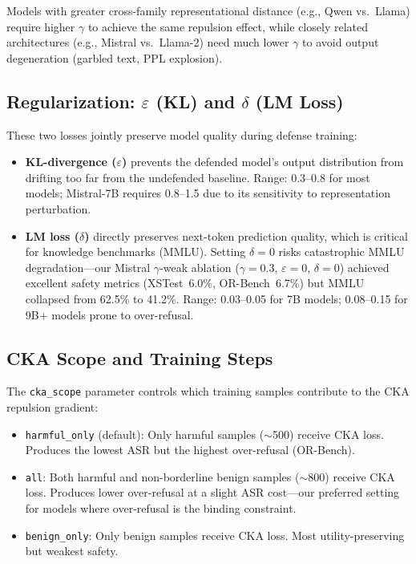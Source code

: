 \noindent Models with greater cross-family representational distance (e.g., Qwen vs.\ Llama) require higher $\gamma$ to achieve the same repulsion effect, while closely related architectures (e.g., Mistral vs.\ Llama-2) need much lower $\gamma$ to avoid output degeneration (garbled text, PPL explosion).

\subsection{Regularization: $\varepsilon$ (KL) and $\delta$ (LM Loss)}
\label{app:hyperparams:reg}

These two losses jointly preserve model quality during defense training:

\begin{itemize}[nosep,leftmargin=*]
    \item \textbf{KL-divergence ($\varepsilon$)} prevents the defended model's output distribution from drifting too far from the undefended baseline. Range: 0.3--0.8 for most models; Mistral-7B requires 0.8--1.5 due to its sensitivity to representation perturbation.
    \item \textbf{LM loss ($\delta$)} directly preserves next-token prediction quality, which is critical for knowledge benchmarks (MMLU). Setting $\delta = 0$ risks catastrophic MMLU degradation---our Mistral $\gamma$-weak ablation ($\gamma{=}0.3$, $\varepsilon{=}0$, $\delta{=}0$) achieved excellent safety metrics (XSTest~6.0\%, OR-Bench~6.7\%) but MMLU collapsed from 62.5\% to 41.2\%. Range: 0.03--0.05 for 7B models; 0.08--0.15 for 9B+ models prone to over-refusal.
\end{itemize}

\subsection{CKA Scope and Training Steps}
\label{app:hyperparams:scope}

The \texttt{cka\_scope} parameter controls which training samples contribute to the CKA repulsion gradient:

\begin{itemize}[nosep,leftmargin=*]
    \item \texttt{harmful\_only} (default): Only harmful samples ($\sim$500) receive CKA loss. Produces the lowest ASR but the highest over-refusal (OR-Bench).
    \item \texttt{all}: Both harmful and non-borderline benign samples ($\sim$800) receive CKA loss. Produces lower over-refusal at a slight ASR cost---our preferred setting for models where over-refusal is the binding constraint.
    \item \texttt{benign\_only}: Only benign samples receive CKA loss. Most utility-preserving but weakest safety.
\end{itemize}

